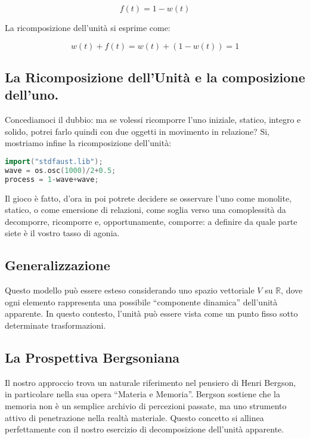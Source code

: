 \documentclass[a4paper,11pt]{article}
\begin{document}
\begin{equation}
f(t) = 1 - w(t)
\end{equation}


La ricomposizione dell'unità si esprime come:

\begin{equation}
w(t) + f(t) = w(t) + (1 - w(t)) = 1
\end{equation}


\subsection{La Ricomposizione dell'Unità e la composizione dell'uno.}

Concediamoci il dubbio: ma se volessi ricomporre l'uno iniziale, statico,
integro e solido, potrei farlo quindi con due oggetti in movimento in
relazione? Si, mostriamo infine la ricomposizione dell'unità:

\begin{lstlisting}[language=c++]
import("stdfaust.lib");
wave = os.osc(1000)/2+0.5;
process = 1-wave+wave;
\end{lstlisting}

Il gioco è fatto, d'ora in poi potrete decidere se osservare l'uno come
monolite, statico, o come emersione di relazioni, come soglia verso
una comoplessità da decomporre, ricomporre e, opportunamente, comporre:
a definire da quale parte siete è il vostro tasso di agonia.

\subsection{Generalizzazione}

Questo modello può essere esteso considerando uno spazio vettoriale $V$
su $\mathbb{R}$, dove ogni elemento rappresenta una possibile
“componente dinamica” dell'unità apparente. In questo contesto,
l'unità può essere vista come un punto fisso sotto determinate
trasformazioni.

\subsection{La Prospettiva Bergsoniana}

Il nostro approccio trova un naturale riferimento nel pensiero di Henri
Bergson, in particolare nella sua opera “Materia e Memoria”. Bergson
sostiene che la memoria non è un semplice archivio di percezioni
passate, ma uno strumento attivo di penetrazione nella realtà materiale.
Questo concetto si allinea perfettamente con il nostro esercizio di
decomposizione dell'unità apparente.
\end{document}
